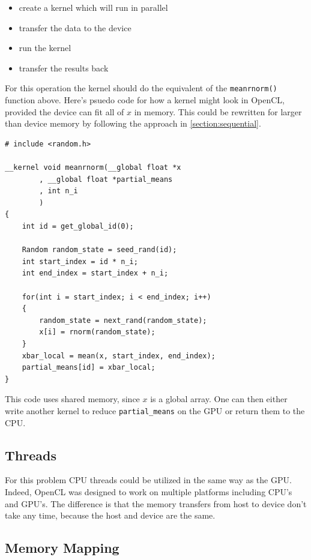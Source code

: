 \documentclass[12pt]{article}
\begin{document}
\begin{itemize}
    \item create a kernel which will run in parallel
    \item transfer the data to the device
    \item run the kernel
    \item transfer the results back
\end{itemize}

For this operation the kernel should do the equivalent of the
\texttt{meanrnorm()} function above.  Here's psuedo code for how a kernel
might look in OpenCL, provided the device can fit all of $x$ in memory.
This could be rewritten for larger than device memory by following the
approach in \ref{section:sequential}.

\begin{verbatim}
# include <random.h>

__kernel void meanrnorm(__global float *x
        , __global float *partial_means
        , int n_i
        )
{
    int id = get_global_id(0);

    Random random_state = seed_rand(id);
    int start_index = id * n_i;
    int end_index = start_index + n_i;

    for(int i = start_index; i < end_index; i++)
    {
        random_state = next_rand(random_state);
        x[i] = rnorm(random_state);
    }
    xbar_local = mean(x, start_index, end_index);
    partial_means[id] = xbar_local;
}
\end{verbatim}

This code uses shared memory, since $x$ is a global array.
One can then either write another kernel to reduce
\texttt{partial\_means} on the GPU or return them to the CPU.

\subsection{Threads}

For this problem CPU threads could be utilized in the same way as the GPU.
Indeed, OpenCL was designed to work on multiple platforms including CPU's
and GPU's. The difference is that the memory transfers from host to device
don't take any time, because the host and device are the same.

\subsection{Memory Mapping}
\end{document}
